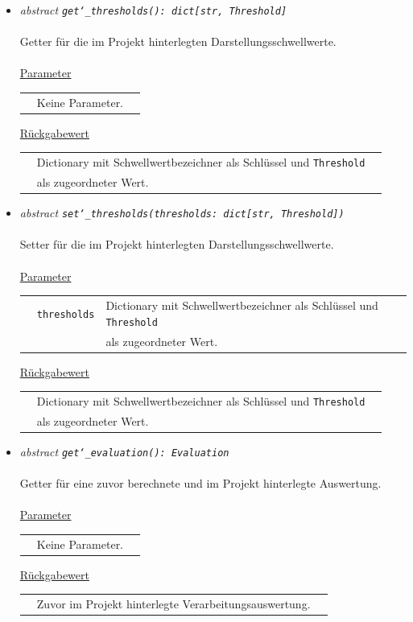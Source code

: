 \documentclass{article}
\begin{document}
\begin{itemize}
\item \textit{\flqq{}abstract\frqq} \texttt{\textit{get\char`_thresholds(): dict[str, Threshold]}}\\\\
Getter für die im Projekt hinterlegten Darstellungsschwellwerte.
\\\\
\underline{Parameter}\\
\begin{tabular}{lll}
 & Keine Parameter.\\
\end{tabular}

\underline{Rückgabewert}\\
\begin{tabular}{lll}
 & Dictionary mit Schwellwertbezeichner als Schlüssel und \texttt{Threshold}\\
 & als zugeordneter Wert.\\
\end{tabular}


\item \textit{\flqq{}abstract\frqq} \texttt{\textit{set\char`_thresholds(thresholds: dict[str, Threshold])}}\\\\
Setter für die im Projekt hinterlegten Darstellungsschwellwerte.
\\\\
\underline{Parameter}\\
\begin{tabular}{lll}
 & \texttt{thresholds} & Dictionary mit Schwellwertbezeichner als Schlüssel und \texttt{Threshold}\\
 && als zugeordneter Wert.\\
\end{tabular}

\underline{Rückgabewert}\\
\begin{tabular}{lll}
 & Dictionary mit Schwellwertbezeichner als Schlüssel und \texttt{Threshold}\\
 & als zugeordneter Wert.\\
\end{tabular}


\item \textit{\flqq{}abstract\frqq} \texttt{\textit{get\char`_evaluation(): Evaluation}}\\\\
Getter für eine zuvor berechnete und im Projekt hinterlegte Auswertung.
\\\\
\underline{Parameter}\\
\begin{tabular}{lll}
 & Keine Parameter.\\
\end{tabular}

\underline{Rückgabewert}\\
\begin{tabular}{lll}
 & Zuvor im Projekt hinterlegte Verarbeitungsauswertung.\\
\end{tabular}
\end{itemize}
\end{document}
